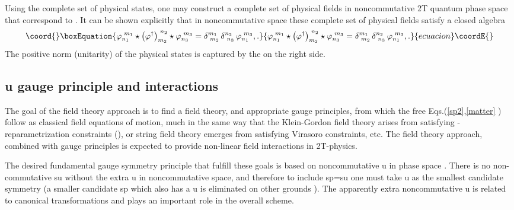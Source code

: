 \documentclass[a4paper,12pt]{article}
\begin{document}
Using the complete set of physical states, \coordHE{} one may construct a complete set of physical fields
\coordHE{} in noncommutative 2T
quantum phase space that correspond to \coordHE{}. It can be shown explicitly
that in noncommutative space these complete set of physical fields
satisfy a closed algebra \cite{NCSp}
\begin{equation}\coord{}\boxEquation{
\varphi _{n_{1}}^{\,\,m_{1}}\star \left( \varphi ^{\dagger }\right)
_{m_{2}}^{\,\,n_{2}}\star \varphi _{n_{3}}^{\,\,m_{3}}=\delta
_{\,\,m_{2}}^{m_{1}}\,\delta _{\,\,n_{3}}^{n_{2}}\,\varphi
_{n_{1}}^{\,\,m_{3}},.
}{
\varphi _{n_{1}}^{\,\,m_{1}}\star \left( \varphi ^{\dagger }\right)
_{m_{2}}^{\,\,n_{2}}\star \varphi _{n_{3}}^{\,\,m_{3}}=\delta
_{\,\,m_{2}}^{m_{1}}\,\delta _{\,\,n_{3}}^{n_{2}}\,\varphi
_{n_{1}}^{\,\,m_{3}},.
}{ecuacion}\coordE{}\end{equation}
The positive norm (unitarity) of the physical states is captured
by the \coordHE{} on the right side.

\subsection{u\coordHE{} gauge principle and interactions}

The goal of the field theory approach is to find a field theory,
and appropriate gauge principles, from which the free
Eqs.(\ref{sp2},\ref{matter} ) follow as classical field equations
of motion, much in the same way that
the Klein-Gordon field theory arises from satisfying \myHighlight{$\tau $}\coordHE{}%
-reparametrization constraints (\coordHE{}), or string field theory emerges
from satisfying Virasoro constraints, etc. The field theory approach,
combined with gauge principles is expected to provide non-linear field
interactions in 2T-physics.

The desired fundamental gauge symmetry principle that fulfill these goals is
based on noncommutative u\coordHE{} in phase space \cite
{NCu11}. There is no non-commutative su\coordHE{} without the
extra u\myHighlight{$\left( 1\right) $}\coordHE{} in noncommutative space, and therefore to include
sp\coordHE{}=su\coordHE{} one must take u\coordHE{} as the smallest candidate symmetry (a smaller candidate
sp\coordHE{} \cite{ncOn} which also has a u\myHighlight{$_{\star
}\left( 1\right) ,$}\coordHE{} is eliminated on other grounds \cite{NCu11}). The
apparently extra noncommutative u\myHighlight{$_{\star }\left( 1\right) $}\coordHE{} is related to
canonical transformations and plays an important role in the overall scheme.
\end{document}
